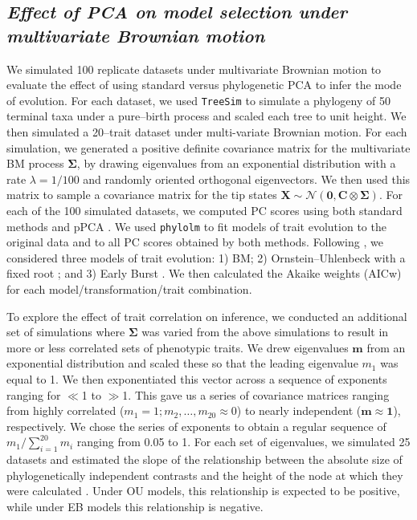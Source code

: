 \documentclass[a4paper,11pt]{article}
\begin{document}
\subsection{\emph{Effect of PCA on model selection under multivariate Brownian motion}}
We simulated 100 replicate datasets under multivariate Brownian motion to evaluate the effect of using standard versus phylogenetic PCA to infer the mode of evolution. For each dataset, we used \texttt{TreeSim} \citep{treesim} to simulate a phylogeny of 50 terminal taxa under a pure--birth process and scaled each tree to unit height. We then simulated a 20--trait dataset under multi-variate Brownian motion. For each simulation, we generated a positive definite covariance matrix for the multivariate BM process $\mathbf{\Sigma}$, by drawing eigenvalues from an exponential distribution with a rate $\lambda = \text{1/100}$ and randomly oriented orthogonal eigenvectors. We then used this matrix to sample a covariance matrix for the tip states 
$\mathbf{X}\sim \mathcal{N}(\mathbf{0}, \mathbf{C} \otimes \mathbf{\Sigma})$.
For each of the 100 simulated datasets, we computed PC scores using both standard methods and pPCA \citep[using the \texttt{phytools} package;][]{phytools}. We used \texttt{phylolm} \citep{HoandAne2014} to fit models of trait evolution to the original data and to all PC scores obtained by both methods. Following \citet{Harmon2010}, we considered three models of trait evolution: 1) BM; 2) Ornstein--Uhlenbeck with a fixed root \citep[OU:][]{ Hansen1997}; and 3) Early Burst \citep[EB:][]{Blomberg2003, Harmon2010}. We then calculated the Akaike weights (AICw) for each model/transformation/trait combination.

To explore the effect of trait correlation on inference, we conducted an additional set of simulations where $\mathbf{\Sigma}$ was varied from the above simulations to result in more or less correlated sets of phenotypic traits. We drew eigenvalues $\mathbf{m}$ from an exponential distribution and scaled these so that the leading eigenvalue $m_{\text{1}}$ was equal to 1. We then exponentiated this vector across a sequence of exponents ranging for $\ll$1 to $\gg$1. This gave us a series of covariance matrices ranging from highly correlated ($m_{\text{1}} = \text{1}; m_{\text{2}}, \ldots, m_{\text{20}} \approx \text{0}$) to nearly independent ($\mathbf{m} \approx \textbf{1}$), respectively. We chose the series of exponents to obtain a regular sequence of $m_{\text{1}} / \sum_{i=\text{1}}^{\text{20}} m_i$ ranging from 0.05 to 1. For each set of eigenvalues, we simulated 25 datasets and estimated the slope of the relationship between the absolute size of phylogenetically independent contrasts \citep{Felsenstein1985} and the height of the node at which they were calculated \citep[i.e., the ``node height test'' of][]{FreckletonHarvey2006}. Under OU models, this relationship is expected to be positive, while under EB models this relationship is negative.
\end{document}

